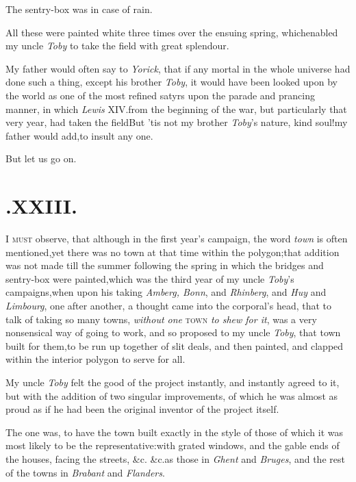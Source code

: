 \documentclass{article}
\begin{document}
\tsh The sentry-box was in case of rain.

All these were painted white three times over the ensuing
spring, which\break enabled my uncle \textit{Toby} to take the field with
great splendour.

My father would often say to \textit{Yorick}, that if any mortal
in the whole universe\pb
had done such a thing, except his bro\-ther \textit{Toby}, it
would have been looked upon by the world as one of the most
refined satyrs upon the parade and prancing manner, in which
\textit{Lewis} XIV.\@ from the beginning of the war, but
particularly that very year, had taken the field\break\tsh But ’tis
not my brother \textit{Toby}’s nature, kind soul!\@ my father
would add,\break to insult any one.

\tsh But let us go on.

\section{.\enspace XXIII.}

\lettrine{I}{ must} observe, that although in the first year’s
campaign, the word \textit{town} is often mentioned,\tsk yet there was no
town at that time within the polygon;\break that addition was not made
till the summer following the spring in which the bridges and
sentry-box were painted,\pb which was the third year of my uncle
\textit{Toby}’s campaigns,\tsk when upon his taking
\textit{Amberg, Bonn}, and \textit{Rhinberg}, and \textit{Huy}
and \textit{Limbourg}, one after another, a thought came into
the corporal’s head, that to talk of taking so many towns,
\textit{without one} \textsc{town} \textit{to shew for it},\tsk
was a very nonsensical way of going to work, and so proposed to
my uncle \textit{Toby}, that 
town built for them,\tsk to be run up together of slit deals,
and then painted, and clapped within the interior polygon to
serve for all.

My uncle \textit{Toby} felt the good of the project instantly, and
instantly agreed to it, but with the addition of two singular
improvements, of which he was almost as proud as if he had been the
original inventor of the project itself.

\newpage
The one was, to have the town built exactly in the style of
those of which it was most likely to be the
representative:\break\tsh with grated windows, and the gable
ends of the houses, facing the streets, \&c. \&c.\tsk as
those in \textit{Ghent} and \textit{Bruges}, and the rest of the towns
in\break
\textit{Brabant} and \textit{Flanders}.
\end{document}
